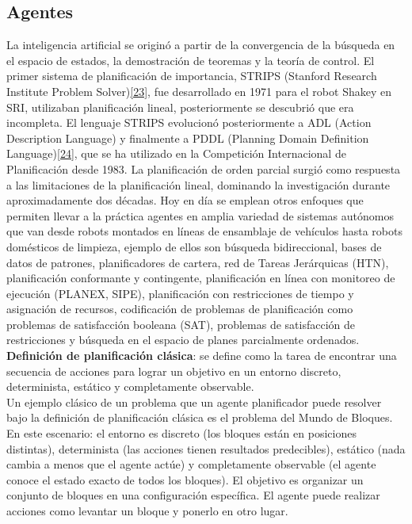 \documentclass{article}
\begin{document}
    \subsection*{ \Large Agentes}

    La inteligencia artificial se originó a partir de la convergencia de la búsqueda en el espacio de estados, la demostración de teoremas y la teoría de control.
        El primer sistema de planificación de importancia, STRIPS (Stanford Research Institute Problem Solver)\hyperref[sec:33]{[23]}, fue desarrollado en 1971 para el robot Shakey en SRI,
        utilizaban planificación lineal, posteriormente se descubrió que era incompleta. El lenguaje STRIPS evolucionó posteriormente a ADL (Action Description
        Language) y finalmente a PDDL (Planning Domain Definition Language)\hyperref[sec:34]{[24]}, que se ha utilizado en la Competición Internacional de Planificación desde 1983.
        La planificación de orden parcial surgió como respuesta a las limitaciones de la planificación lineal, dominando la investigación durante aproximadamente dos
        décadas. Hoy en día se emplean otros enfoques que permiten llevar a la práctica agentes en amplia variedad de sistemas autónomos que van desde robots montados
        en líneas de ensamblaje de vehículos hasta robots domésticos de limpieza, ejemplo de ellos son búsqueda bidireccional, bases de datos de patrones,
        planificadores de cartera, red de Tareas Jerárquicas (HTN), planificación conformante y contingente, planificación en línea con monitoreo de ejecución
        (PLANEX, SIPE), planificación con restricciones de tiempo y asignación de recursos, codificación de problemas de planificación
        como problemas de satisfacción booleana (SAT), problemas de satisfacción de restricciones y búsqueda en el espacio de planes parcialmente ordenados. \\


        \textbf{Definición de planificación clásica}: se define como la tarea de encontrar una secuencia de acciones para lograr un objetivo en un entorno discreto, determinista, estático y completamente observable. \\

        Un ejemplo clásico de un problema que un agente planificador puede resolver bajo la definición de planificación clásica es el problema del Mundo de Bloques. En este escenario: el entorno es discreto (los bloques están en posiciones distintas), determinista (las acciones tienen resultados predecibles), estático (nada cambia a menos que el agente actúe) y completamente observable (el agente conoce el estado exacto de todos los bloques). El objetivo es organizar un conjunto de bloques en una configuración específica. El agente puede realizar acciones como levantar un bloque y ponerlo en otro lugar.\\
\end{document}
